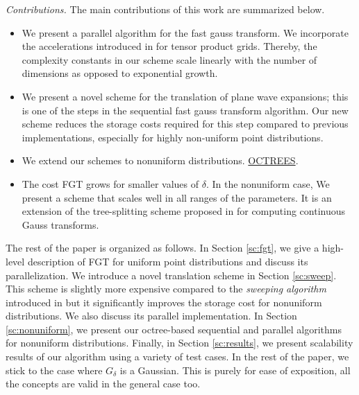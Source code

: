 {\em Contributions.} The main contributions of this work are summarized below.
\begin{itemize} 
%
\item We present a parallel algorithm for the fast gauss transform. 
We incorporate the accelerations introduced in \cite{fggt} for tensor product grids. 
Thereby, the complexity constants in our scheme scale linearly with the number of dimensions 
as opposed to exponential growth. 
%
\item We present a novel scheme for the translation of plane wave expansions; this is one
of the steps in the sequential fast gauss transform algorithm. Our new scheme reduces the 
 storage costs required for this step compared to previous implementations, especially for highly
non-uniform point distributions.
%
\item We extend our schemes to nonuniform distributions. \ul{OCTREES}.

\item The cost FGT grows for smaller values of $\delta$. In the nonuniform case, 
We present a scheme that scales well in all ranges of the parameters. It is an extension of the tree-splitting scheme 
proposed in \cite{veerapaneni08} for computing continuous Gauss transforms. 
%
\end{itemize}

The rest of the paper is organized as follows. In Section \ref{sc:fgt}, we give a high-level description of FGT for uniform point distributions and discuss its parallelization. We introduce a novel translation scheme in Section \ref{sc:sweep}. This scheme is slightly more expensive compared to the {\em sweeping algorithm} introduced in \cite{greengard98} but it 
significantly improves the storage cost for nonuniform distributions. We also discuss its parallel implementation. In Section 
\ref{sc:nonuniform}, we present our octree-based sequential and parallel algorithms for nonuniform distributions. Finally, in 
Section \ref{sc:results}, we  present scalability results of our algorithm using a variety of test cases. 
In the rest of the paper, we stick to the case where $G_\delta$ is a Gaussian. This is purely for ease of exposition, all the concepts are valid in the general case too. 
